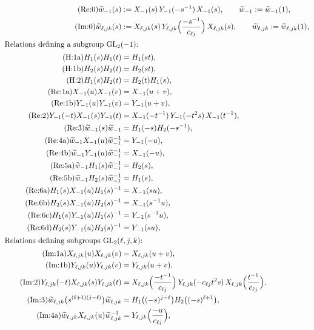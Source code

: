 \documentclass[11pt]{article}
\theoremstyle{definition}
\theoremstyle{remark}
\newcommand{\wt}{\widetilde{w}}
\begin{document}
\begin{align*}
\tag{Re:0}
  \wt_{-1}(s) &:= X_{-1}(s)\,Y_{-1}(-s^{-1})\,X_{-1}(s), \qquad \wt_{-1}:=\wt_{-1}(1),\\
\tag{Im:0}
  \wt_{\ell,jk}(s) &:= X_{\ell,jk}(s)\,Y_{\ell,jk}\Bigl(\frac{-s^{-1}}{c_{\ell j}}\Bigr)\,X_{\ell,jk}(s), \qquad \wt_{\ell,jk}:=\wt_{\ell,jk}(1),\\
\intertext{Relations defining a subgroup $\mathrm{GL}_2(-1)$:}
\tag{H:1a} H_1(s)H_1(t)&=H_1(st),\\
\tag{H:1b} H_2(s)H_2(t)&=H_2(st),\\
\tag{H:2} H_1(s)H_2(t)&=H_2(t)H_1(s),\\
\tag{Re:1a} X_{-1}(u)X_{-1}(v)&=X_{-1}(u+v),\\
\tag{Re:1b} Y_{-1}(u)Y_{-1}(v)&=Y_{-1}(u+v),\\
\tag{Re:2} Y_{-1}(-t)X_{-1}(s)Y_{-1}(t)&=X_{-1}(-t^{-1})\,Y_{-1}(-t^{2}s)\,X_{-1}(t^{-1}),\\
\tag{Re:3} \wt_{-1}(s)\wt_{-1}&=H_1(-s)H_2(-s^{-1}),\\
\tag{Re:4a} \wt_{-1}X_{-1}(u)\wt_{-1}^{-1}&=Y_{-1}(-u),\\
\tag{Re:4b} \wt_{-1}Y_{-1}(u)\wt_{-1}^{-1}&=X_{-1}(-u),\\
\tag{Re:5a} \wt_{-1}H_1(s)\wt_{-1}^{-1}&=H_2(s),\\
\tag{Re:5b} \wt_{-1}H_2(s)\wt_{-1}^{-1}&=H_1(s),\\
\tag{Re:6a} H_1(s)X_{-1}(u)H_1(s)^{-1}&=X_{-1}(su),\\
\tag{Re:6b} H_2(s)X_{-1}(u)H_2(s)^{-1}&=X_{-1}(s^{-1}u),\\
\tag{Re:6c} H_1(s)Y_{-1}(u)H_1(s)^{-1}&=Y_{-1}(s^{-1}u),\\
\tag{Re:6d} H_2(s)Y_{-1}(u)H_2(s)^{-1}&=Y_{-1}(su),\\
\intertext{Relations defining subgroups $\mathrm{GL}_2(\ell,j,k)$:}
\tag{Im:1a} X_{\ell,jk}(u)X_{\ell,jk}(v)&=X_{\ell,jk}(u+v),\\
\tag{Im:1b} Y_{\ell,jk}(u)Y_{\ell,jk}(v)&=Y_{\ell,jk}(u+v),\\
\tag{Im:2} Y_{\ell,jk}(-t)X_{\ell,jk}(s)Y_{\ell,jk}(t)&=X_{\ell,jk}\Bigl(\frac{-t^{-1}}{c_{\ell j}}\Bigr)\,Y_{\ell,jk}(-c_{\ell j}t^2s)\,X_{\ell,jk}\Bigl(\frac{t^{-1}}{c_{\ell j}}\Bigr),\\
\tag{Im:3} \wt_{\ell,jk}\bigl(s^{(\ell+1)(j-\ell)}\bigr)\wt_{\ell,jk}&=H_1\bigl((-s)^{j-\ell}\bigr)H_2\bigl((-s)^{\ell+1}\bigr),\\
\tag{Im:4a} \wt_{\ell,jk}X_{\ell,jk}(u)\wt_{\ell,jk}^{-1}&=Y_{\ell,jk}\Bigl(\frac{-u}{c_{\ell j}}\Bigr),\\

\end{align*}
\end{document}
